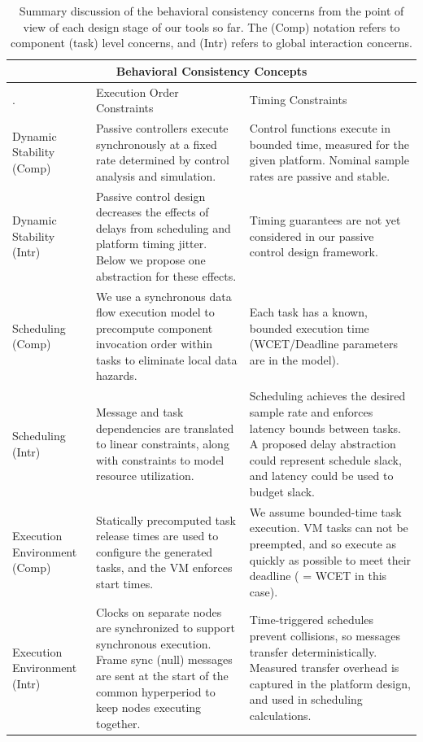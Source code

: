 \begin{table}
	\centering
		\begin{tabular}[width=0.75\columnwidth]{@{\extracolsep{\fill}} | p{1.2cm} | p{3.25cm} | p{3.05cm} | }
		\hline
		\multicolumn{3}{|c|}{Behavioral Consistency Concepts} \\
		\hline
		. & Execution Order Constraints & Timing Constraints \\ \hline \hline
		Dynamic Stability (Comp) & Passive controllers execute synchronously at a fixed rate determined by control analysis and simulation. & Control functions execute in bounded time, measured for the given platform. Nominal sample rates are passive and stable. \\ \hline
		Dynamic Stability (Intr) & Passive control design decreases the effects of delays from scheduling and platform timing jitter. Below we propose one abstraction for these effects. & Timing guarantees are not yet considered in our passive control design framework. \\ \hline
		\hline
	    Scheduling (Comp) & We use a synchronous data flow execution model to precompute component invocation order within tasks to eliminate local data hazards. & Each task has a known, bounded execution time (WCET/Deadline parameters are in the model).  \\ \hline
		Scheduling (Intr) & Message and task dependencies are translated to linear constraints, along with constraints to model resource utilization. & Scheduling achieves the desired sample rate and enforces latency bounds between tasks.  A proposed delay abstraction could represent schedule slack, and latency could be used to budget slack. \\ \hline
 \hline
		Execution Environment (Comp) & Statically precomputed task release times are used to configure the generated tasks, and the VM enforces start times. & We assume bounded-time task execution.  VM tasks can not be preempted, and so execute as quickly as possible to meet their deadline ( = WCET in this case). \\ \hline
		Execution Environment (Intr) & Clocks on separate nodes are synchronized to support synchronous execution.  Frame sync (null) messages are sent at the start of the common hyperperiod to keep nodes executing together.  & Time-triggered schedules prevent collisions, so messages transfer deterministically. Measured transfer overhead is captured in the platform design, and used in scheduling calculations. \\ \hline
		\end{tabular}
	\caption{Summary discussion of the behavioral consistency concerns from the point of view of each design stage of our tools so far.  The (Comp) notation refers to component (task) level concerns, and (Intr) refers to global interaction concerns.}
	\label{tab:consistencyTools}
\end{table}

